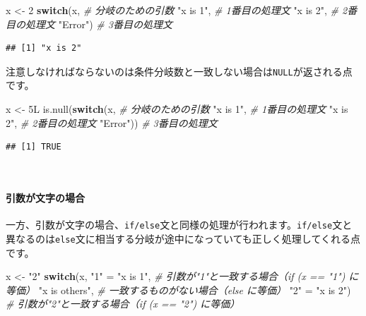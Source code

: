 \documentclass[
  12pt,
]{book}
\newenvironment{Shaded}{\begin{snugshade}}{\end{snugshade}}
\newcommand{\CommentTok}[1]{\textcolor[rgb]{0.56,0.35,0.01}{\textit{#1}}}
\newcommand{\ControlFlowTok}[1]{\textcolor[rgb]{0.13,0.29,0.53}{\textbf{#1}}}
\newcommand{\DecValTok}[1]{\textcolor[rgb]{0.00,0.00,0.81}{#1}}
\newcommand{\FunctionTok}[1]{\textcolor[rgb]{0.00,0.00,0.00}{#1}}
\newcommand{\NormalTok}[1]{#1}
\newcommand{\OtherTok}[1]{\textcolor[rgb]{0.56,0.35,0.01}{#1}}
\newcommand{\StringTok}[1]{\textcolor[rgb]{0.31,0.60,0.02}{#1}}
\begin{document}
\begin{Shaded}
\begin{Highlighting}[]
\NormalTok{x }\OtherTok{\textless{}{-}} \DecValTok{2}
\ControlFlowTok{switch}\NormalTok{(x,                 }\CommentTok{\# 分岐のための引数}
       \StringTok{"x is 1"}\NormalTok{,          }\CommentTok{\# 1番目の処理文}
       \StringTok{"x is 2"}\NormalTok{,          }\CommentTok{\# 2番目の処理文}
       \StringTok{"Error"}\NormalTok{)           }\CommentTok{\# 3番目の処理文}
\end{Highlighting}
\end{Shaded}

\begin{verbatim}
## [1] "x is 2"
\end{verbatim}

注意しなければならないのは条件分岐数と一致しない場合は\texttt{NULL}が返される点です。

\begin{Shaded}
\begin{Highlighting}[]
\NormalTok{x }\OtherTok{\textless{}{-}}\NormalTok{ 5L}
\FunctionTok{is.null}\NormalTok{(}\ControlFlowTok{switch}\NormalTok{(x,         }\CommentTok{\# 分岐のための引数}
               \StringTok{"x is 1"}\NormalTok{,  }\CommentTok{\# 1番目の処理文}
               \StringTok{"x is 2"}\NormalTok{,  }\CommentTok{\# 2番目の処理文}
               \StringTok{"Error"}\NormalTok{))  }\CommentTok{\# 3番目の処理文}
\end{Highlighting}
\end{Shaded}

\begin{verbatim}
## [1] TRUE
\end{verbatim}

　

\hypertarget{ux5f15ux6570ux304cux6587ux5b57ux306eux5834ux5408}{%
\paragraph{引数が文字の場合}\label{ux5f15ux6570ux304cux6587ux5b57ux306eux5834ux5408}}

一方、引数が文字の場合、\texttt{if/else}文と同様の処理が行われます。\texttt{if/else}文と異なるのは\texttt{else}文に相当する分岐が途中になっていても正しく処理してくれる点です。

\begin{Shaded}
\begin{Highlighting}[]
\NormalTok{x }\OtherTok{\textless{}{-}} \StringTok{"2"}
\ControlFlowTok{switch}\NormalTok{(x,}
       \StringTok{"1"} \OtherTok{=} \StringTok{"x is 1"}\NormalTok{,    }\CommentTok{\# 引数が"1"と一致する場合（\textasciigrave{}if (x == "1")\textasciigrave{} に等価）}
       \StringTok{"x is others"}\NormalTok{,     }\CommentTok{\# 一致するものがない場合（\textasciigrave{}else\textasciigrave{} に等価）}
       \StringTok{"2"} \OtherTok{=} \StringTok{"x is 2"}\NormalTok{)    }\CommentTok{\# 引数が"2"と一致する場合（\textasciigrave{}if (x == "2")\textasciigrave{} に等価）}
\end{Highlighting}
\end{Shaded}
\end{document}
